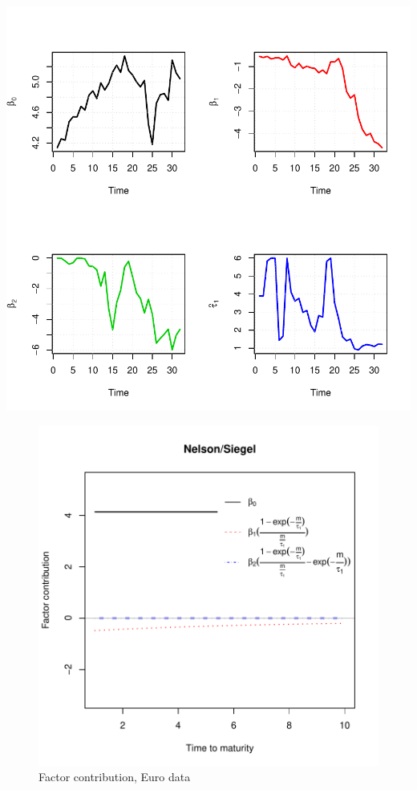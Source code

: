 \documentclass{article}
\begin{document}
\begin{spacing}{1.5}
\includegraphics{Graduation_Paper-017}

\begin{center}
\begin{figure}[htbp]
\includegraphics{Graduation_Paper-018}
\caption{Factor contribution, Euro data}
\end{figure}
\end{center}


\end{spacing}
\end{document}
